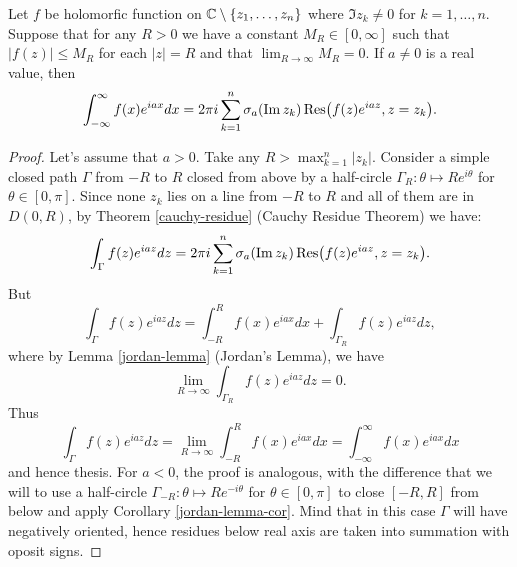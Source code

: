 \documentclass[main.tex]{subfiles}
\begin{document}
\begin{lemma}
\label{fourier-residues}
Let $f$ be holomorfic function on $\mathbb{C}\setminus \{z_1, \dots, z_n\}$ where $\Im z_k \not= 0$ for 
$k=1, \dots, n$. Suppose that for any $R > 0$ we have a constant $M_R\in[0, \infty]$ such that $|f(z)| \leq M_R$ for each $|z| = R$ and that $\lim_{R\to\infty} M_R = 0$.
If $a\not= 0$ is a real value, then
\begin{equation}
\int_{-\infty}^\infty f(x) e^{iax}dx = 2\pi i \sum_{k=1}^n \sigma_a(\Im z_k) 
\Res(f(z)e^{iaz}, z=z_k).
\end{equation}
\end{lemma}
\begin{proof}
Let's assume that $a > 0$. Take any $R > \max_{k=1}^n |z_k|$. Consider a simple closed path $\Gamma$ from $-R$ to $R$ closed from above by a half-circle $\Gamma_{R}: \theta \mapsto Re^{i\theta}$ for $\theta\in[0, \pi]$. Since none $z_k$ lies on a line from $-R$ to $R$ and all of them are in $D(0, R)$, by Theorem \ref{cauchy-residue} (Cauchy Residue Theorem) we have:
\begin{equation}
\int_\Gamma f(z) e^{iaz}dz = 2\pi i \sum_{k=1}^n \sigma_a(\Im z_k) 
\Res(f(z)e^{iaz}, z=z_k).
\end{equation}
But 
\begin{equation}
\int_\Gamma f(z) e^{iaz}dz = \int_{-R}^R f(x) e^{iax}dx + \int_{\Gamma_R} f(z) e^{iaz}dz,
\end{equation}
where by Lemma \ref{jordan-lemma} (Jordan's Lemma), we have 
\begin{equation}
\lim_{R\to \infty} \int_{\Gamma_R} f(z) e^{iaz}dz = 0.
\end{equation}
Thus 
\begin{equation}
\int_\Gamma f(z) e^{iaz}dz = \lim_{R\to \infty}\int_{-R}^R f(x) e^{iax}dx = 
\int_{-\infty}^\infty f(x) e^{iax}dx
\end{equation}
and hence thesis.
For $a < 0$, the proof is analogous, with the difference that we will to use a half-circle $\Gamma_{-R}: \theta \mapsto Re^{-i\theta}$ for $\theta\in[0, \pi]$ to close $[-R, R]$ from below and apply Corollary \ref{jordan-lemma-cor}. Mind that in this case $\Gamma$ will have negatively oriented, hence residues below real axis are taken into summation with oposit signs.
\end{proof}
\end{document}
